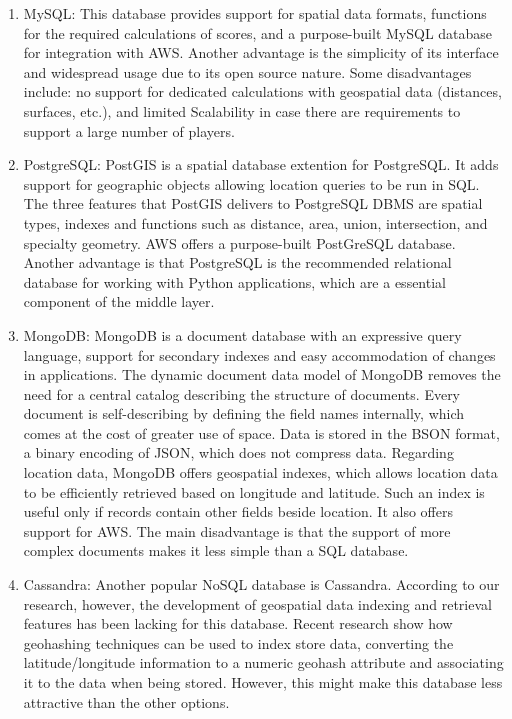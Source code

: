 \documentclass[conference]{IEEEtran}
\begin{document}
\begin{enumerate}

\item MySQL: This database provides support for spatial data formats, functions for the required calculations of scores, and a purpose-built MySQL database for integration with AWS. Another advantage is the simplicity of its interface and widespread usage due to its open source nature. Some disadvantages include: no support for dedicated calculations with geospatial data (distances, surfaces, etc.), and limited Scalability in case there are requirements to support a large number of players. 

\item PostgreSQL: PostGIS is a spatial database extention for PostgreSQL. It adds support for geographic objects allowing location queries to be run in SQL. The three features that PostGIS delivers to PostgreSQL DBMS are spatial types, indexes and functions such as distance, area, union, intersection, and specialty geometry. AWS offers a purpose-built PostGreSQL database. Another advantage is that PostgreSQL is the recommended relational database for working with Python applications, which are a essential component of the middle layer.

\item MongoDB: MongoDB is a document database with an expressive query language, support for secondary indexes and easy accommodation of changes in applications. The dynamic document data model of MongoDB removes the need for a central catalog describing the structure of documents. Every document is self-describing by defining the field names internally, which comes at the cost of greater use of space. Data is stored in the BSON format, a binary encoding of JSON, which does not compress data. 
Regarding location data, MongoDB offers geospatial indexes, which allows location data to be efficiently retrieved based on longitude and latitude. Such an index is useful only if records contain other fields beside location. It also offers support for AWS. The main disadvantage is that the support of more complex documents makes it less simple than a SQL database. 
 
\item Cassandra: Another popular NoSQL database is Cassandra. According to our research, however, the development of geospatial data indexing and retrieval features has been lacking for this database.  Recent research show how geohashing techniques can be used to index store data, converting the latitude/longitude information to a numeric geohash attribute and associating it to the data when being stored. However, this might make this database less attractive than the other options. 

\end{enumerate}
\end{document}
